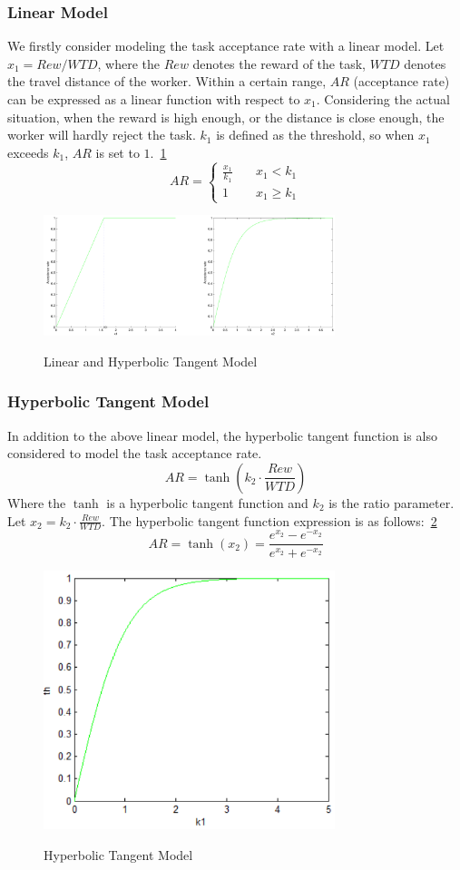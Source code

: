 \subsubsection{Linear Model}
We firstly consider modeling the task acceptance rate with a linear model. Let $x_1=Rew/WTD$, where the $Rew$ denotes the reward of the task, $WTD$ denotes the travel distance of the worker. Within a certain range, $AR$ (acceptance rate) can be expressed as a linear function with respect to $x_1$. Considering the actual situation, when the reward is high enough, or the distance is close enough, the worker will hardly reject the task. $k_1$ is defined as the threshold, so when $x_1$ exceeds $k_1$, $AR$ is set to $1$.~\ref{img:LinTanh}
$$
	AR= \left \{
	\begin{array}{cl}
	\frac{x_1}{k_1} \quad & \mbox{$x_1<k_1$} \\
	1 \quad & \mbox{$x_1 \geq k_1$}
	\end{array}
	\right.
$$

\begin{figure}
\includegraphics[width=8.5cm]{LinTanh}
\label{img:LinTanh}
\caption{Linear and Hyperbolic Tangent Model}
\end{figure}

\subsubsection{Hyperbolic Tangent Model}
In addition to the above linear model, the hyperbolic tangent function is also considered to model the task acceptance rate.
$$
	AR=\tanh (k_2 \cdot \frac{Rew}{WTD})
$$
Where the $\tanh$ is a hyperbolic tangent function and $k_2$ is the ratio parameter. Let $x_2=k_2 \cdot \frac{Rew}{WTD}$. The hyperbolic tangent function expression is as follows:~\ref{img:TanhModel}
$$
	AR=\tanh (x_2)=\frac{e^{x_2}-e^{-x_2}}{e^{x_2}+e^{-x_2}}
$$

\begin{figure}
\includegraphics[width=8.5cm]{TanhModel}
\label{img:TanhModel}
\caption{Hyperbolic Tangent Model}
\end{figure}

